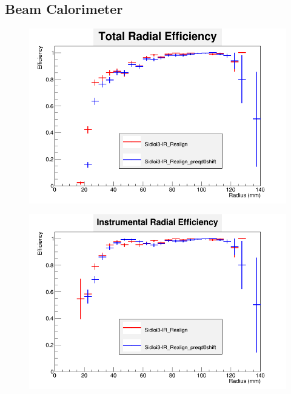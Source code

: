 \documentclass{report}
\begin{document}
            \subsection{Beam Calorimeter}
                \begin{figure}[H] 
                    \includegraphics[width=\textwidth]{RadialEfficiencyFP_total}
                    \centering
                    \caption{}
                    \label{lstar_beamcal_total}
                \end{figure}
                \begin{figure}[H]
                    \includegraphics[width=\textwidth]{RadialEfficiencyFP_instrumental}
                    \centering
                    \caption{}
                    \label{lstar_beamcal_inst}
                \end{figure}
\end{document}

